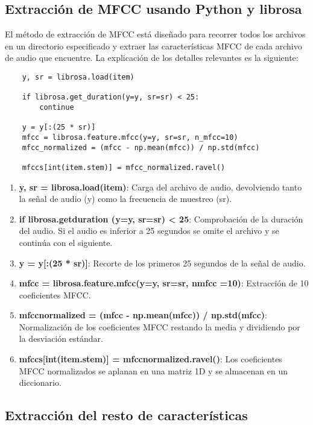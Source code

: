 \subsection{Extracción de MFCC usando Python y librosa}

El método de extracción de MFCC está diseñado para recorrer todos los archivos en un directorio especificado y extraer las características MFCC de cada archivo de audio que encuentre. La explicación de los detalles relevantes es la siguiente:

\begin{verbatim}
	y, sr = librosa.load(item)

	if librosa.get_duration(y=y, sr=sr) < 25:
		continue

	y = y[:(25 * sr)]
	mfcc = librosa.feature.mfcc(y=y, sr=sr, n_mfcc=10)
	mfcc_normalized = (mfcc - np.mean(mfcc)) / np.std(mfcc)

	mfccs[int(item.stem)] = mfcc_normalized.ravel()
\end{verbatim}

\begin{enumerate}
\item \textbf{y, sr = librosa.load(item)}: Carga del archivo de audio, devolviendo tanto la señal de audio (y) como la frecuencia de muestreo (sr).

\item \textbf{if librosa.get\textunderscore duration (y=y, sr=sr) < 25}: Comprobación de la duración del audio. Si el audio es inferior a 25 segundos se omite el archivo y se continúa con el siguiente.

\item \textbf{y = y[:(25 * sr)]}: Recorte de los primeros 25 segundos de la señal de audio.

\item\textbf{mfcc = librosa.feature.mfcc(y=y, sr=sr, n\textunderscore mfcc =10)}: Extracción de 10 coeficientes MFCC.

\item \textbf{mfcc\textunderscore normalized = (mfcc - np.mean(mfcc)) / np.std(mfcc)}: Normalización de los coeficientes MFCC restando la media y dividiendo por la desviación estándar.

\item\textbf{mfccs[int(item.stem)] = mfcc\textunderscore normalized.ravel()}: Los coeficientes MFCC normalizados se aplanan en una matriz 1D y se almacenan en un diccionario.
\end{enumerate}

\subsection{Extracción del resto de características}

